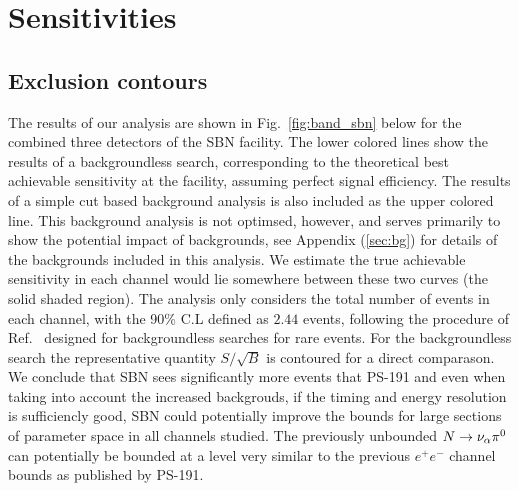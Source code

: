 \documentclass[11pt, a4paper]{article}
\newcommand{\reffig}[1]{Fig.~\ref{#1}}
\newcommand{\refref}[1]{Ref.~\cite{#1}}
\def\ster{\ensuremath N}
\begin{document}
\section{\label{sec:sensitivities}Sensitivities}

\subsection{Exclusion contours}
%
The results of our analysis are shown in \reffig{fig:band_sbn} below for the
combined three detectors of the SBN facility. The lower colored lines show the
results of a backgroundless search, corresponding to the theoretical best
achievable sensitivity at the facility, assuming perfect signal efficiency. The
results of a simple cut based background analysis is also included as the upper
colored line. This background analysis is not optimsed, however, and serves
primarily to show the potential impact of backgrounds, see Appendix
(\ref{sec:bg}) for details of the backgrounds included in this analysis. We
estimate the true achievable sensitivity in each channel would lie somewhere
between these two curves (the solid shaded region). The analysis only considers
the total number of events in each channel, with the 90\% C.L defined as $2.44$
events, following the procedure of \refref{Feldman:1997qc} designed for
backgroundless searches for rare events. For the backgroundless search the
representative quantity $S/\sqrt{B}$ is contoured for a direct comparason.  \\

We conclude that SBN sees significantly more events that PS-191 and even when taking into account the increased backgrouds, if the timing and energy resolution is sufficiencly good, SBN could potentially improve the bounds for large sections of parameter space in all
channels studied. The previously unbounded $\ster \rightarrow \nu_\alpha \pi^0$ can potentially be bounded at a level very similar to the previous $e^+ e^-$ channel bounds as published by PS-191.  
\end{document}
